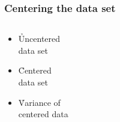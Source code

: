 \begin{frame}[c]
  \frametitle{Centering the data set}

  \begin{columns}[c]
    \begin{column}{40mm}
      \begin{itemize}
      \item \h<beamer:1| handout:1>{Uncentered\\ data set}%
        \gap
      \item \h<beamer:2| handout:2>{Centered\\ data set}%
        \gap
      \item \h<beamer:3| handout:3>{Variance of\\ centered data}%
        \gap
      \end{itemize}
    \end{column}
    \begin{column}{60mm}
    \end{column}
  \end{columns}
\end{frame}


